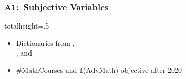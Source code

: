 \documentclass[12pt, aspectratio=169]{beamer}
\begin{document}
\begin{frame}[label=sv]
\frametitle{A1:\ Subjective Variables}
\addtocounter{framenumber}{-1}
\begin{table}[htbp]
  \centering
  \addtocounter{table}{-1}
  \renewcommand{\thetable}{\arabic{table}c}
  \caption{Subjective Independent Variables}
  \vspace{5pt}
  \begin{adjustbox}{totalheight=.5\textheight}

  \end{adjustbox}
\end{table}%
\begin{itemize}
\item Dictionaries from \citet{madera2009}, \\ \citet{young2012}, and \citet{bai2022}
\vspace{2.5pt}
\item \#MathCourses and $\mathds 1$(AdvMath) objective after 2020
\vspace{2.5pt}
\end{itemize}
\hyperlink{dd}{}
\end{frame}
\end{document}
